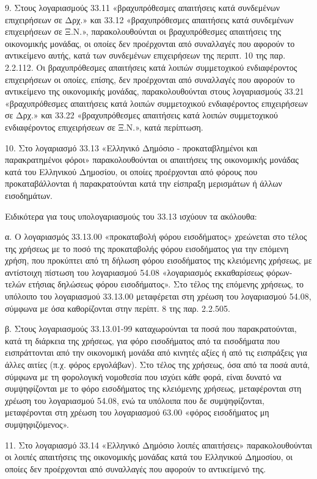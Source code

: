 \documentclass[A4,10pt,greek]{book}
\begin{document}
9. Στους λογαριασμούς 33.11 «βραχυπρόθεσμες απαιτήσεις κατά συνδεμένων επιχειρήσεων σε Δρχ.» και 33.12 «βραχυπρόθεσμες απαιτήσεις κατά συνδεμένων επιχειρήσεων σε Ξ.Ν.», παρακολουθούνται οι βραχυπρόθεσμες απαιτήσεις της οικονομικής μονάδας, οι οποίες δεν προέρχονται από συναλλαγές που αφορούν το αντικείμενο αυτής, κατά των συνδεμένων επιχειρήσεων της περιπτ. 10 της παρ.  2.2.112. Οι βραχυπρόθεσμες απαιτήσεις κατά λοιπών συμμετοχικού ενδιαφέροντος επιχειρήσεων οι οποίες, επίσης, δεν προέρχονται από συναλλαγές που αφορούν το αντικείμενο της οικονομικής μονάδας, παρακολουθούνται στους λογαριασμούς 33.21 «βραχυπρόθεσμες απαιτήσεις κατά λοιπών συμμετοχικού ενδιαφέροντος επιχειρήσεων σε Δρχ.» και 33.22 «βραχυπρόθεσμες απαιτήσεις κατά λοιπών συμμετοχικού ενδιαφέροντος επιχειρήσεων σε Ξ.Ν.», κατά περίπτωση.

10. Στο λογαριασμό 33.13 «Ελληνικό Δημόσιο - προκαταβλημένοι και παρακρατημένοι φόροι» παρακολουθούνται οι απαιτήσεις της οικονομικής μονάδας κατά του Ελληνικού Δημοσίου, οι οποίες προέρχονται από φόρους που προκαταβάλλονται ή παρακρατούνται κατά την είσπραξη μερισμάτων ή άλλων εισοδημάτων.

Ειδικότερα για τους υπολογαριασμούς του 33.13 ισχύουν τα ακόλουθα:

α. Ο λογαριασμός 33.13.00 «προκαταβολή φόρου εισοδήματος» χρεώνεται στο τέλος της χρήσεως με το ποσό της προκαταβολής φόρου εισοδήματος για την επόμενη χρήση, που προκύπτει από τη δήλωση φόρου εισοδήματος της κλειόμενης χρήσεως, με αντίστοιχη πίστωση του λογαριασμού 54.08 «λογαριασμός εκκαθαρίσεως φόρων-τελών ετήσιας δηλώσεως φόρου εισοδήματος». Στο τέλος της επόμενης χρήσεως, το υπόλοιπο του λογαριασμού 33.13.00 μεταφέρεται στη χρέωση του λογαριασμού 54.08, σύμφωνα με όσα καθορίζονται στην περίπτ. 8 της παρ. 2.2.505.

β. Στους λογαριασμούς 33.13.01-99 καταχωρούνται τα ποσά που παρακρατούνται, κατά τη διάρκεια της χρήσεως, για φόρο εισοδήματος από τα εισοδήματα που εισπράττονται από την οικονομική μονάδα από κινητές αξίες ή από τις εισπράξεις για άλλες αιτίες (π.χ. φόρος εργολάβων). Στο τέλος της χρήσεως, όσα από τα ποσά αυτά, σύμφωνα με τη φορολογική νομοθεσία που ισχύει κάθε φορά, είναι δυνατό να συμψηφίζονται με το φόρο εισοδήματος της κλειόμενης χρήσεως, μεταφέρονται στη χρέωση του λογαριασμού 54.08, ενώ τα υπόλοιπα που δε συμψηφίζονται, μεταφέρονται στη χρέωση του λογαριασμού 63.00 «φόρος εισοδήματος μη συμψηφιζόμενος».

11. Στο λογαριασμό 33.14 «Ελληνικό Δημόσιο λοιπές απαιτήσεις» παρακολουθούνται οι λοιπές απαιτήσεις της οικονομικής μονάδας κατά του Ελληνικού Δημοσίου, οι οποίες δεν προέρχονται από συναλλαγές που αφορούν το αντικείμενό της.
\end{document}
